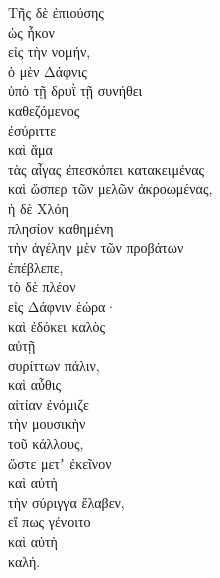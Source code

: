 {\large
\begin{greek}
\noindent Τῆς δὲ ἐπιούσης \\
\tabto{2em} ὡς ἧκον \\
\tabto{4em} εἰς τὴν νομήν, \\
ὁ μὲν Δάφνις \\
\tabto{2em} ὑπὸ τῇ δρυῒ τῇ συνήθει \\
\tabto{4em} καθεζόμενος \\
\tabto{6em} ἐσύριττε \\
καὶ ἅμα \\
\tabto{4em} τὰς αἶγας ἐπεσκόπει κατακειμένας \\
\tabto{6em} καὶ ὥσπερ τῶν μελῶν ἀκροωμένας, \\
ἡ δὲ Χλόη \\
\tabto{2em} πλησίον καθημένη \\
\tabto{2em} τὴν ἀγέλην μὲν τῶν προβάτων \\
\tabto{4em} ἐπέβλεπε, \\
\tabto{2em} τὸ δὲ πλέον \\
\tabto{4em} εἰς Δάφνιν ἑώρα· \\
καὶ ἐδόκει καλὸς \\
\tabto{2em} αὐτῇ \\
συρίττων πάλιν, \\
καὶ αὖθις \\
\tabto{2em} αἰτίαν ἐνόμιζε \\
\tabto{4em} τὴν μουσικὴν \\
\tabto{6em} τοῦ κάλλους, \\
ὥστε μετʼ ἐκεῖνον \\
\tabto{2em} καὶ αὐτὴ \\
\tabto{4em} τὴν σύριγγα ἔλαβεν, \\
\tabto{6em} εἴ πως γένοιτο \\
\tabto{6em} καὶ αὐτὴ \\
\tabto{8em} καλή.\\

\end{greek}
}


